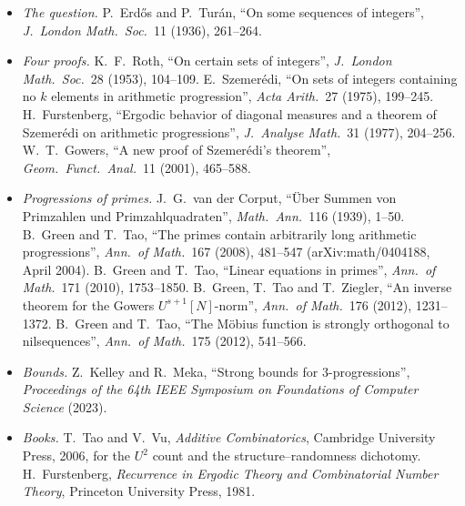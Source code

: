 \begin{itemize}
\item \emph{The question.} P.~Erd\H{o}s and P.~Tur\'an, ``On some sequences of integers'', \emph{J.\ London Math.\ Soc.}\ 11 (1936), 261--264.
\item \emph{Four proofs.} K.~F.~Roth, ``On certain sets of integers'', \emph{J.\ London Math.\ Soc.}\ 28 (1953), 104--109. E.~Szemer\'edi, ``On sets of integers containing no $k$ elements in arithmetic progression'', \emph{Acta Arith.}\ 27 (1975), 199--245. H.~Furstenberg, ``Ergodic behavior of diagonal measures and a theorem of Szemer\'edi on arithmetic progressions'', \emph{J.\ Analyse Math.}\ 31 (1977), 204--256. W.~T.~Gowers, ``A new proof of Szemer\'edi's theorem'', \emph{Geom.\ Funct.\ Anal.}\ 11 (2001), 465--588.
\item \emph{Progressions of primes.} J.~G.~van der Corput, ``\"Uber Summen von Primzahlen und Primzahlquadraten'', \emph{Math.\ Ann.}\ 116 (1939), 1--50. B.~Green and T.~Tao, ``The primes contain arbitrarily long arithmetic progressions'', \emph{Ann.\ of Math.}\ 167 (2008), 481--547 (arXiv:math/0404188, April 2004). B.~Green and T.~Tao, ``Linear equations in primes'', \emph{Ann.\ of Math.}\ 171 (2010), 1753--1850. B.~Green, T.~Tao and T.~Ziegler, ``An inverse theorem for the Gowers $U^{s+1}[N]$-norm'', \emph{Ann.\ of Math.}\ 176 (2012), 1231--1372. B.~Green and T.~Tao, ``The M\"obius function is strongly orthogonal to nilsequences'', \emph{Ann.\ of Math.}\ 175 (2012), 541--566.
\item \emph{Bounds.} Z.~Kelley and R.~Meka, ``Strong bounds for 3-progressions'', \emph{Proceedings of the 64th IEEE Symposium on Foundations of Computer Science} (2023).
\item \emph{Books.} T.~Tao and V.~Vu, \emph{Additive Combinatorics}, Cambridge University Press, 2006, for the $U^2$ count and the structure--randomness dichotomy. H.~Furstenberg, \emph{Recurrence in Ergodic Theory and Combinatorial Number Theory}, Princeton University Press, 1981.
\end{itemize}
